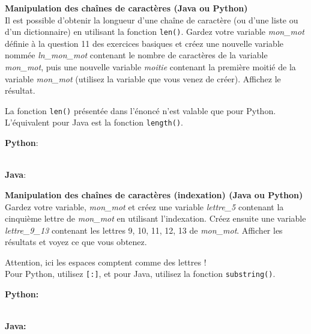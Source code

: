 \begin{Exercice}[10 minutes] \textbf{Manipulation des chaînes de caractères (Java ou Python)}\\
   Il est possible d'obtenir la longueur d'une chaîne de caractère (ou d'une liste ou d'un dictionnaire) en utilisant la fonction \lstinline{len()}. Gardez votre variable \textit{mon\_mot} définie à la question 11 des exercices basiques et créez une nouvelle variable nommée \textit{ln\_mon\_mot} contenant le nombre de caractères de la variable \textit{mon\_mot}, puis une nouvelle variable \textit{moitie} contenant la première moitié de la variable \textit{mon\_mot} (utilisez la variable que vous venez de créer). Affichez le résultat.   \\
   
    \begin{conseil}
      	La fonction \lstinline{len()} présentée dans l'énoncé n'est valable que pour Python. L'équivalent pour Java est la fonction \lstinline{length()}.
        
    \end{conseil}
    \begin{solution}
    
    \textbf{Python}:
    
    
    \textbf{\\Java}:
    
    \end{solution}   
\end{Exercice}

\begin{Exercice}[10 minutes] \textbf{Manipulation des chaînes de caractères (indexation) (Java ou Python)}\\
  Gardez votre variable, \textit{mon\_mot} et créez une variable \textit{lettre\_5} contenant la cinquième lettre de \textit{mon\_mot} en utilisant l'indexation. Créez ensuite une variable \textit{lettre\_9\_13} contenant les lettres 9, 10, 11, 12, 13 de \textit{mon\_mot}. Afficher les résultats et voyez ce que vous obtenez.  \\
  
   \begin{conseil}
       Attention, ici les espaces comptent comme des lettres ! \\

   Pour Python, utilisez \lstinline{[:]}, et pour Java, utilisez la fonction \lstinline{substring()}.
       
   \end{conseil}
   \begin{solution}
   
    \textbf{Python:}    
    
    
    \textbf{\\Java:}
    
   \end{solution}   
\end{Exercice}


